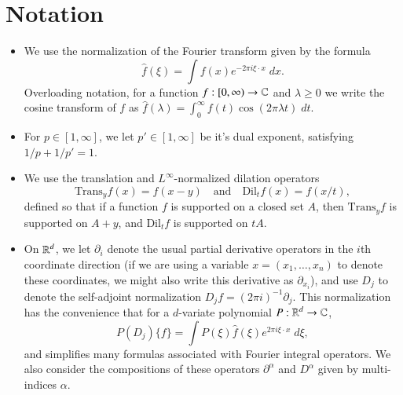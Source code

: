 
\chapter{Notation} \label{not:not}

\vspace{-1em}

\begin{itemize}
    \item We use the normalization of the Fourier transform given by the formula
    \[ \widehat{f}(\xi) = \int f(x) e^{- 2 \pi i \xi \cdot x}\; dx. \]
    Overloading notation, for a function $f: [0,\infty) \to \operatorname{\mathbb{C}}$ and $\lambda \geq 0$ we write the cosine transform of $f$ as $\widehat{f}(\lambda) = \int_0^\infty f(t) \cos(2 \pi \lambda t)\; dt$.

    \item For $p \in [1,\infty]$, we let $p' \in [1,\infty]$ be it's dual exponent, satisfying $1/p + 1/p' = 1$.

    \item We use the translation and $L^\infty$-normalized dilation operators
    \[ \text{Trans}_y f(x) = f(x - y) \quad\text{and}\quad \text{Dil}_t f(x) = f(x/t), \]
    defined so that if a function $f$ is supported on a closed set $A$, then $\text{Trans}_y f$ is supported on $A + y$, and $\text{Dil}_t f$ is supported on $tA$. %

    \item On $\operatorname{\mathbb{R}}^d$, we let $\partial_i$ denote the usual partial derivative operators in the $i$th coordinate direction (if we are using a variable $x = (x_1,\dots,x_n)$ to denote these coordinates, we might also write this derivative as $\partial_{x_i}$), and use $D_j$ to denote the self-adjoint normalization $D_j f = (2 \pi i)^{-1} \partial_j$. This normalization has the convenience that for a $d$-variate polynomial $P: \operatorname{\mathbb{R}}^d \to \operatorname{\mathbb{C}}$,
    \[ P(D_j) \{ f \} = \int P(\xi) \widehat{f}(\xi) e^{2 \pi i \xi \cdot x}\; d\xi, \]
    and simplifies many formulas associated with Fourier integral operators. We also consider the compositions of these operators $\partial^\alpha$ and $D^\alpha$ given by multi-indices $\alpha$.


\end{itemize}

